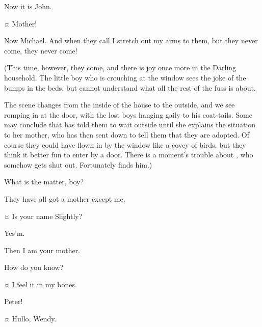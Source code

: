 \begin{drama}
\mrsdarlingspeaks
Now it is John.

\michaelspeaks {}¤
Mother!

\mrsdarlingspeaks
Now Michael.
And when they call I stretch out my arms to them, but they never come, they never come!

\begin{stagedir}
(This time, however, they come, and there is joy once more in the Darling household.
The little boy who is crouching at the window sees the joke of the bumps in the beds,
but cannot understand what all the rest of the fuss is about.

The scene changes from the inside of the house to the outside,
and we see \mrdarling romping in at the door, with the lost boys hanging gaily to his coat-tails.
Some may conclude that \wendy has told them to wait outside until she explains the situation to her mother,
who has then sent \mrdarling down to tell them that they are adopted.
Of course they could have flown in by the window like a covey of birds,
but they think it better fun to enter by a door.
There is a moment's trouble about \slightly, who somehow gets shut out.
Fortunately \liza finds him.)
\end{stagedir}

\lizaspeaks
What is the matter, boy?

\slightlyspeaks
They have all got a mother except me.

\lizaspeaks {}¤
Is your name Slightly?

\slightlyspeaks
Yes'm.

\lizaspeaks
Then I am your mother.

\slightlyspeaks
How do you know?

\lizaspeaks {}¤
I feel it in my bones.


\wendyspeaks
Peter!

\peterspeaks {}¤
Hullo, Wendy.



\end{drama}
